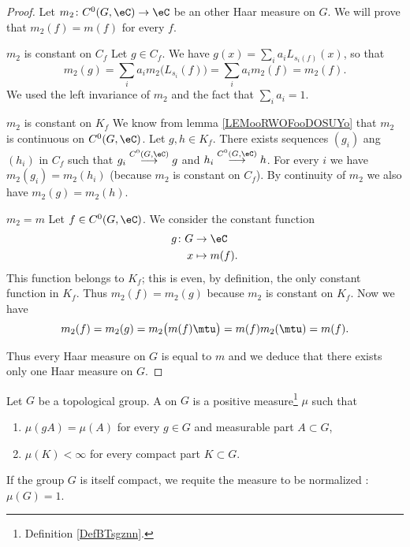 \begin{proof}
    Let \( m_2\colon C^0(G,\eC)\to \eC\) be an other Haar measure on \( G\). We will prove that \( m_2(f)=m(f)\) for every \( f\). 
    \begin{subproof}
    \item[\( m_2\) is constant on \( C_f\)]
        Let \( g\in C_f\). We have \( g(x)=\sum_ia_iL_{s_i(f)}(x)\), so that
        \begin{equation}
            m_2(g)=\sum_ia_im_2\big(L_{s_i}(f)\big)=\sum_ia_im_2(f)=m_2(f).
        \end{equation}
        We used the left invariance of \( m_2\) and the fact that \( \sum_ia_i=1\).
    \item[\( m_2\) is constant on \( K_f\)]
        We know from lemma \ref{LEMooRWOFooDOSUYo} that \( m_2\) is continuous on \( C^0(G,\eC)\). Let \( g,h\in K_f\). There exists sequences \( (g_i)\) ang \( (h_i)\) in \( C_f\) such that \( g_i\stackrel{C^0(G,\eC)}{\longrightarrow}g\) and \( h_i\stackrel{C^0(G,\eC)}{\longrightarrow} h\). For every \( i\) we have \( m_2(g_i)=m_2(h_i)\) (because \( m_2\) is constant on \( C_f\)). By continuity of \( m_2\) we also have \( m_2(g)=m_2(h)\).
    \item[\( m_2=m\)]
        Let \( f\in C^0(G,\eC)\). We consider the constant function 
        \begin{equation}
            \begin{aligned}
                g\colon G&\to \eC \\
                x&\mapsto m(f). 
            \end{aligned}
        \end{equation}
        This function belongs to \( K_f\); this is even, by definition, the only constant function in \( K_f\). Thus \( m_2(f)=m_2(g)\) because \( m_2\) is constant on \( K_f\). Now we have
        \begin{equation}
            m_2(f)=m_2(g)=m_2\big( m(f)\mtu \big)=m(f)m_2(\mtu)=m(f).
        \end{equation}
    \end{subproof}
    Thus every Haar measure on \( G\) is equal to \( m\) and we deduce that there exists only one Haar measure on \( G\).
\end{proof}

\begin{definition}      \label{DEFooXIKEooWOxHlr}
    Let \( G\) be a topological group. A  on \( G\) is a positive measure\footnote{Definition \ref{DefBTsgznn}.} \( \mu\) such that
	\begin{enumerate}
		\item
		      \( \mu(gA)=\mu(A)\) for every \( g\in G\) and measurable part \( A\subset G\),
		\item
		      \( \mu(K)<\infty\) for every compact part \( K\subset G\).
	\end{enumerate}
    If the group \( G\) is itself compact, we requite the measure to be normalized : \( \mu(G)=1\).
\end{definition}

